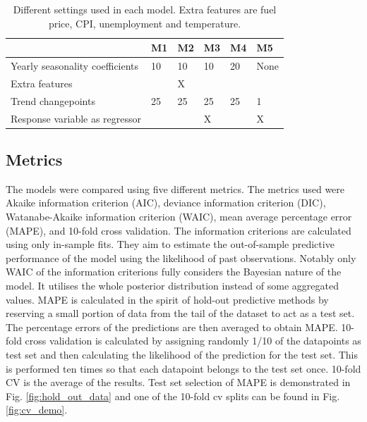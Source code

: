 \documentclass[english, 12pt, a4paper, sci, utf8, a-1b, online]{aaltothesis}
\begin{document}
\begin{abstractpage}[english]

\begin{table}[]
	\centering
	\caption{\label{tab:model_settings} Different settings used in each model. Extra features are fuel price, CPI, unemployment and temperature.}
	\begin{tabular}{|l|l|l|l|l|l|}
		\hline
																		& \textbf{M1} & \textbf{M2} & \textbf{M3} & \textbf{M4} & \textbf{M5} \\ \hline
		Yearly seasonality coefficients & 10          & 10          & 10          & 20          & None        \\ \hline
		Extra features                  &             & X           &             &             &             \\ \hline
		Trend changepoints              & 25          & 25          & 25          & 25          & 1           \\ \hline
		Response variable as regressor  &             &             & X           &             & X           \\ \hline
		\end{tabular}
\end{table}




\subsection{Metrics}

The models were compared using five different metrics. The metrics used were Akaike information criterion (AIC), deviance information criterion (DIC), Watanabe-Akaike information criterion (WAIC), mean average percentage error (MAPE), and 10-fold cross validation. The information criterions are calculated using only in-sample fits. They aim to estimate the out-of-sample predictive performance of the model using the likelihood of past observations. Notably only WAIC of the information criterions fully considers the Bayesian nature of the model. It utilises the whole posterior distribution instead of some aggregated values. MAPE is calculated in the spirit of hold-out predictive methods by reserving a small portion of data from the tail of the dataset to act as a test set. The percentage errors of the predictions are then averaged to obtain MAPE. 10-fold cross validation is calculated by assigning randomly 1/10 of the datapoints as test set and then calculating the likelihood of the prediction for the test set. This is performed ten times so that each datapoint belongs to the test set once. 10-fold CV is the average of the results. Test set selection of MAPE is demonstrated in Fig. \ref{fig:hold_out_data} and one of the 10-fold cv splits can be found in Fig. \ref{fig:cv_demo}. 


\end{abstractpage}
\end{document}

